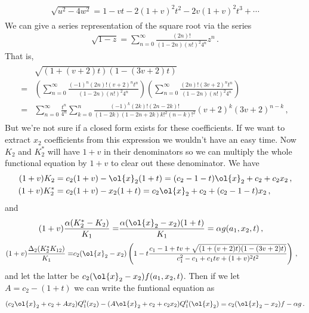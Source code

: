 \begin{align}
\begin{split}
	\sqrt{u^2-4w^2} = 1 - vt-2(1+v)^2 t^2-2v(1+v)^2t^3+\cdots
\end{split}
\end{align}
We can give a series representation of the square root via the series
\begin{align}
	\sqrt{1-z} = \sum_{n=0}^\infty \frac{(2n)!}{(1-2n)(n!)^2 4^n}z^n\,.
\end{align}
That is,
\begin{align}
\begin{split}
	&\sqrt{(1+(v+2)t)(1-(3v+2)t)} \\=& \left(\sum_{n=0}^\infty \frac{(-1)^n(2n)!(v+2)^n t^n}{(1-2n)(n!)^2 4^n}\right)\left(\sum_{n=0}^\infty \frac{(2n)!(3v+2)^nt^n}{(1-2n)(n!)^2 4^n}\right)\\
	=& \sum_{n=0}^\infty \frac{t^n}{4^n}\sum_{k=0}^n \frac{(-1)^k(2k)!(2n-2k)!}{(1-2k)(1-2n+2k)k!^2 (n-k)!^2}(v+2)^k(3v+2)^{n-k}\,,
\end{split}
\end{align}
But we're not sure if a closed form exists for these coefficients. If we want to extract $x_2$ coefficients from this expression we wouldn't have an easy time. Now $K_2$ and $K_2^\ast$ will have $1+v$ in their denominators so we can multiply the whole functional equation by $1+v$ to clear out these denominator. We have
\begin{align}
	(1+v)K_2 &= c_2(1+v)-\ol{x}_2(1+t) = (c_2-1-t)\ol{x}_2+c_2+c_2x_2\,,\\
	(1+v)K_2^\ast &= c_2(1+v)-x_2(1+t) = c_2\ol{x}_2+c_2+(c_2-1-t)x_2\,,
\end{align}
and
\begin{align}
	(1+v)\frac{\alpha(K_2^\ast -K_2)}{K_1} = &\frac{\alpha (\ol{x}_2 - x_2)(1+t)}{K_1} = \alpha g(a_1,x_2,t)\,,
\end{align}
\begin{align}
\begin{split}
	(1+v)\frac{\Delta_2(K_2^\ast K_{12})}{K_1}=&c_2(\ol{x}_2-x_2)\left(1-t\frac{c_1-1+tv+\sqrt{(1+(v+2)t)(1-(3v+2)t)}}{c_1^2-c_1+c_1tv+(1+v)^2t^2}\right)\,,
\end{split}
\end{align}
and let the latter be $c_2(\ol{x}_2-x_2)f(a_1,x_2,t)$. Then if we let $A = c_2-(1+t)$ we can write the funtional equation as
\begin{align}
	(c_2\ol{x}_2+c_2+Ax_2)Q_1^0(x_2) - (A\ol{x}_2+c_2+c_2 x_2)Q_1^0(\ol{x}_2) = c_2(\ol{x}_2-x_2)f-\alpha g\,.
\end{align}
